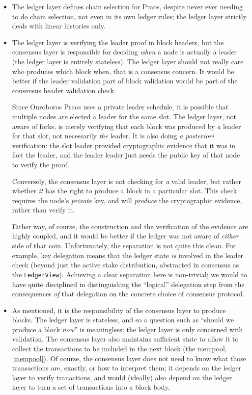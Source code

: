 \begin{itemize}
\item The ledger layer defines chain selection for Praos, despite never ever
needing to do chain selection, not even in its own ledger rules; the ledger
layer strictly deals with linear histories only.
\item The ledger layer is verifying the leader proof in block headers, but the
consensus layer is responsible for deciding \emph{when} a node is actually a
leader (the ledger layer is entirely stateless). The ledger layer should not
really care who produces which block when, that is a consensus concern. It would
be better if the leader validation part of block validation would be part of the
consensus header validation check.

Since Ouroboros Praos uses a private leader schedule, it is possible that
multiple nodes are elected a leader for the same slot. The ledger layer, not
aware of forks, is merely verifying that each block was produced by \emph{a}
leader for that slot, not necessarily \emph{the} leader. It is also doing
\emph{a posteriori} verification: the slot leader provided cryptographic
evidence that it was in fact the leader, and the leader leader just needs the
public key of that node to verify the proof.

Conversely, the consensus layer is not checking for \emph{a} valid leader, but
rather whether \emph{it} has the right to produce a block in a particular slot.
This check requires the node's \emph{private} key, and will \emph{produce} the
cryptographic evidence, rather than verify it.

Either way, of course, the construction and the verification of the evidence are
highly coupled, and it would be better if the ledger was not aware of
\emph{either} side of that coin. Unfortunately, the separation is not quite this
clean. For example, key delegation means that the ledger state \emph{is}
involved in the leader check (beyond just the active stake distribution,
abstracted in consensus as the \lstinline!LedgerView!). Achieving a clear
separation here is non-trivial; we would to have quite disciplined in
distinguishing the ``logical'' delegation step from the consequences \emph{of}
that delegation on the concrete choice of consensus protocol.

\item As mentioned, it is the responsibility of the consensus layer to produce
blocks. The ledger layer is stateless, and so a question such as ``should we
produce a block \emph{now}'' is meaningless: the ledger layer is only concerned
with validation. The consensus layer also maintains sufficient state to allow it
to collect the transactions to be included in the next block (the mempool,
\cref{mempool}). Of course, the consensus layer does not need to know what those
transactions are, exactly, or how to interpret them; it depends on the ledger
layer to verify tranactions, and would (ideally) also depend on the ledger layer
to turn a set of transactions into a block body.


\end{itemize}

